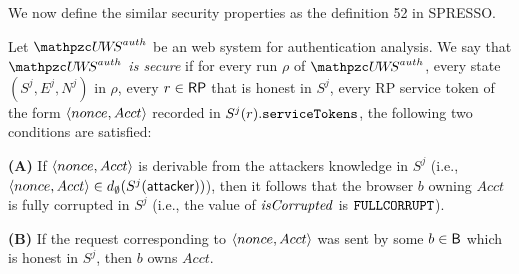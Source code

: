   We now define the similar security properties as the definition 52 in SPRESSO. 
  
  \begin{definition}\label{def:uppresso-security-property} 
    Let $\uppressoauthwebsystem$ be an \uppresso web system for authentication analysis. 
    We say that \emph{$\uppressoauthwebsystem$ is secure} if for every run $\rho$ of
    $\uppressoauthwebsystem$, every state $(S^j, E^j, N^j)$ in $\rho$,
    every $r\in \mathsf{RP}$ that is honest in $S^j$, every RP service token of the form 
    $\langle {{}nonce, Acct} \rangle$ recorded in $S^j(r).\mathtt{serviceTokens}$, the following two conditions are
    satisfied:
  
    \textbf{(A)} If $\langle {{}nonce, Acct} \rangle$ is derivable from the attackers knowledge
    in $S^j$ (i.e., $\langle {{}nonce, Acct} \rangle \in d_{\emptyset}(S^j(\mathsf{attacker}))$),
    then it follows that the browser $b$ owning $Acct$ is fully corrupted
    in $S^j$ (i.e., the value of $\mathit{isCorrupted}$ is $\mathtt{FULLCORRUPT}$).
  
    \textbf{(B)} If the request corresponding to $\langle {{}nonce, Acct} \rangle$ was sent by
    some $b\in \mathsf{B}$ which is honest in $S^j$, then $b$ owns $Acct$.
  \end{definition}
  
  
  
  
  
